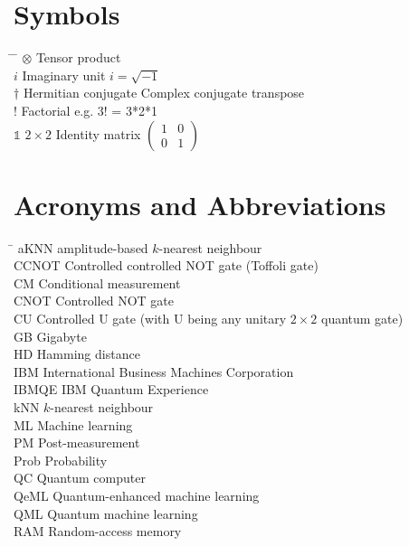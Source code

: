 \section*{Symbols}
\begin{tabbing}
 \hspace*{1.6cm} \= \hspace*{8cm} \= \kill
 $\otimes$ \> Tensor product \\[0.5ex]
 $i$ \> Imaginary unit \> $i=\sqrt{-1}$ \\[0.5ex]
 $\dagger$ \> Hermitian conjugate \> Complex conjugate transpose \\[0.5ex]
 $!$ \> Factorial \> e.g. 3! = 3*2*1 \\[0.5ex]
 $\mathbb{1}$ \> $2\times2$ Identity matrix \> $\begin{pmatrix} 1 & 0 \\ 0 & 1 \end{pmatrix}$ \\[0.5ex]
\end{tabbing}

\section*{Acronyms and Abbreviations}
\begin{tabbing}
 \hspace*{1.6cm}  \= \kill
 aKNN \> amplitude-based $k$-nearest neighbour \\[0.5ex]
 CCNOT \> Controlled controlled NOT gate (Toffoli gate) \\[0.5ex]
 CM \> Conditional measurement \\[0.5ex]
 CNOT \> Controlled NOT gate \\[0.5ex]
 CU \> Controlled U gate (with U being any unitary $2\times2$ quantum gate) \\[0.5ex]
 GB \> Gigabyte \\[0.5ex]
 HD \> Hamming distance \\[0.5ex]
 IBM \> International Business Machines Corporation \\[0.5ex]
 IBMQE \> IBM Quantum Experience \\[0.5ex]
 kNN \> $k$-nearest neighbour \\[0.5ex]
 ML \> Machine learning \\[0.5ex]
 PM \> Post-measurement \\[0.5ex]
 Prob \> Probability \\[0.5ex]
 QC \> Quantum computer \\[0.5ex]
 QeML \> Quantum-enhanced machine learning \\[0.5ex]
 QML \> Quantum machine learning \\[0.5ex]
 RAM \> Random-access memory \\[0.5ex]
 
\end{tabbing}

 \cleardoublepage

